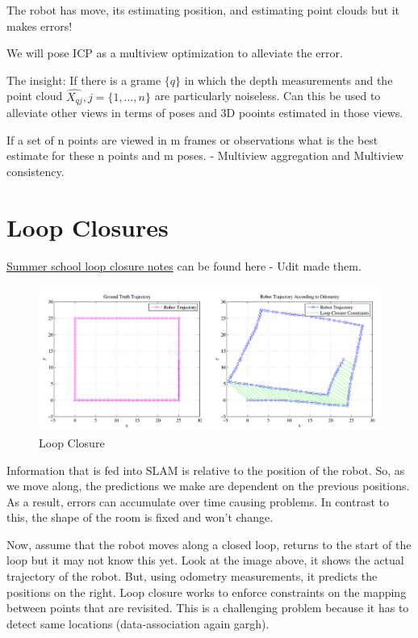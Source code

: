 The robot has move, its estimating position, and estimating point clouds but it makes errors!

We will pose ICP as a multiview optimization to alleviate the error.

The insight: If there is a grame $\{q\}$ in which the depth measurements and the point cloud $\hat{X_{qj}}, j=\{1,\hdots,n\}$ are particularly noiseless. Can this be used to alleviate other views in terms of poses and 3D pooints estimated in those views. 

If a set of n points are viewed in m frames or observations what is the best estimate for these n points and m poses. - Multiview aggregation and Multiview consistency.

\section{Loop Closures}

\href{https://www.notion.so/Loop-Closure-8ab30a4560ea4d859c92c515c99ef70a}{Summer school loop closure notes} can be found here - Udit made them.

\begin{figure}[h]
    \centering
    \includegraphics[width=12cm ]{img/loop_closure.png}
    \caption{Loop Closure}
    \label{fig:loop_closure}
\end{figure}

Information that is fed into SLAM is relative to the position of the robot. So, as we move along, the predictions we make are dependent on the previous positions. As a result, errors can accumulate over time causing problems. In contrast to this, the shape of the room is fixed and won't change. 

Now, assume that the robot moves along a closed loop, returns to the start of the loop but it may not know this yet.  Look at the image above, it shows the actual trajectory of the robot. But, using odometry measurements, it predicts the positions on the right. Loop closure works to enforce constraints on the mapping between points that are revisited. This is a challenging problem because it has to detect same locations (data-association again gargh).


